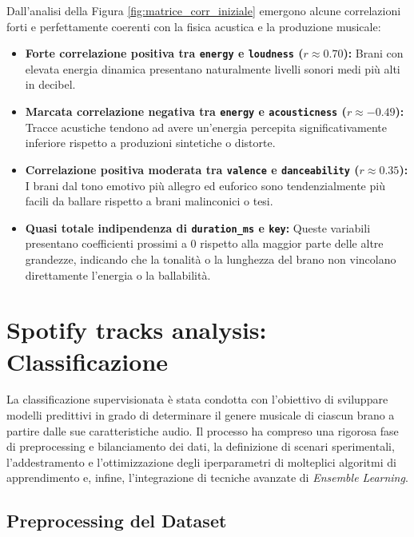 \documentclass[12pt,a4paper]{article}
\begin{document}
Dall'analisi della Figura \ref{fig:matrice_corr_iniziale} emergono alcune correlazioni forti e perfettamente coerenti con la fisica acustica e la produzione musicale:
\begin{itemize}
    \item \textbf{Forte correlazione positiva tra \texttt{energy} e \texttt{loudness} ($r \approx 0.70$):} Brani con elevata energia dinamica presentano naturalmente livelli sonori medi più alti in decibel.
    \item \textbf{Marcata correlazione negativa tra \texttt{energy} e \texttt{acousticness} ($r \approx -0.49$):} Tracce acustiche tendono ad avere un'energia percepita significativamente inferiore rispetto a produzioni sintetiche o distorte.
    \item \textbf{Correlazione positiva moderata tra \texttt{valence} e \texttt{danceability} ($r \approx 0.35$):} I brani dal tono emotivo più allegro ed euforico sono tendenzialmente più facili da ballare rispetto a brani malinconici o tesi.
    \item \textbf{Quasi totale indipendenza di \texttt{duration\_ms} e \texttt{key}:} Queste variabili presentano coefficienti prossimi a 0 rispetto alla maggior parte delle altre grandezze, indicando che la tonalità o la lunghezza del brano non vincolano direttamente l'energia o la ballabilità.
\end{itemize}

\newpage
\section{Spotify tracks analysis: Classificazione}

La classificazione supervisionata è stata condotta con l'obiettivo di sviluppare modelli predittivi in grado di determinare il genere musicale di ciascun brano a partire dalle sue caratteristiche audio. Il processo ha compreso una rigorosa fase di preprocessing e bilanciamento dei dati, la definizione di scenari sperimentali, l'addestramento e l'ottimizzazione degli iperparametri di molteplici algoritmi di apprendimento e, infine, l'integrazione di tecniche avanzate di \textit{Ensemble Learning}.

\subsection{Preprocessing del Dataset}
\end{document}
